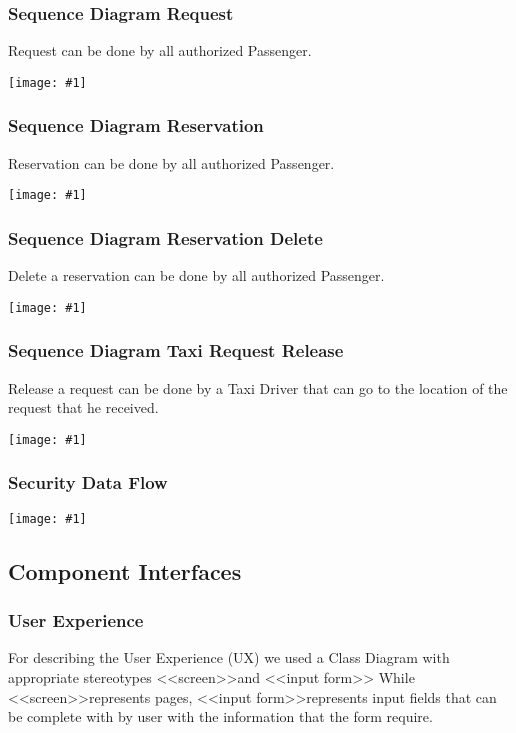\documentclass[11pt, a4paper,titlepage]{article}
\newcommand{\image}[1]{
	\begin{center}
		\noindent \texttt{[image: \#1]}
	\end{center}
	}
\begin{document}
\subsubsection{Sequence Diagram Request}
 Request can be done by all authorized Passenger.
 \image{sequenceDiagramsRequest.png}

\subsubsection{Sequence Diagram Reservation}
 Reservation can be done by all authorized Passenger.
 \image{sequenceDiagramsReservation.png}

\subsubsection{Sequence Diagram Reservation Delete}
 Delete a reservation can be done by all authorized Passenger.
 \image{sequenceDiagramsReservationDelete.png}

\subsubsection{Sequence Diagram Taxi Request Release}
 Release a request can be done by a Taxi Driver that can go to the location of the request that he received.
 \image{sequenceDiagramsTaxiRequestRelease.png}
 
 \subsubsection{Security Data Flow}
 \image{diagram_security_dataflow.png}
\subsection{Component Interfaces}
	\subsubsection{User Experience}
	For describing the User Experience (UX) we used a Class Diagram with appropriate stereotypes \textless \textless screen\textgreater \textgreater  and \textless \textless input form\textgreater \textgreater 
	While \textless \textless screen\textgreater \textgreater  represents pages, \textless \textless input form\textgreater \textgreater  represents input fields that can be complete with by user with the information that the form require.
\end{document}
